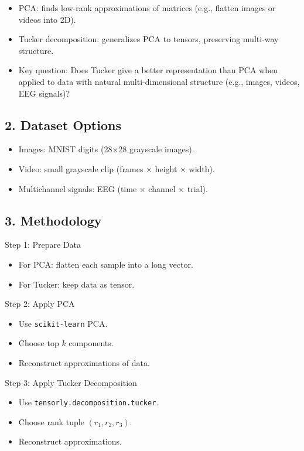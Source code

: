 \documentclass[
  letterpaper,
  DIV=11,
  numbers=noendperiod]{scrreprt}
\providecommand{\tightlist}{%
  \setlength{\itemsep}{0pt}\setlength{\parskip}{0pt}}
\begin{document}
\begin{itemize}
\tightlist
\item
  PCA: finds low-rank approximations of matrices (e.g., flatten images
  or videos into 2D).
\item
  Tucker decomposition: generalizes PCA to tensors, preserving multi-way
  structure.
\item
  Key question: Does Tucker give a better representation than PCA when
  applied to data with natural multi-dimensional structure (e.g.,
  images, videos, EEG signals)?
\end{itemize}

\subsection{2. Dataset Options}\label{dataset-options}

\begin{itemize}
\tightlist
\item
  Images: MNIST digits (28×28 grayscale images).
\item
  Video: small grayscale clip (frames × height × width).
\item
  Multichannel signals: EEG (time × channel × trial).
\end{itemize}

\subsection{3. Methodology}\label{methodology}

Step 1: Prepare Data

\begin{itemize}
\tightlist
\item
  For PCA: flatten each sample into a long vector.
\item
  For Tucker: keep data as tensor.
\end{itemize}

Step 2: Apply PCA

\begin{itemize}
\tightlist
\item
  Use \texttt{scikit-learn} PCA.
\item
  Choose top \(k\) components.
\item
  Reconstruct approximations of data.
\end{itemize}

Step 3: Apply Tucker Decomposition

\begin{itemize}
\tightlist
\item
  Use \texttt{tensorly.decomposition.tucker}.
\item
  Choose rank tuple \((r_1, r_2, r_3)\).
\item
  Reconstruct approximations.
\end{itemize}
\end{document}

